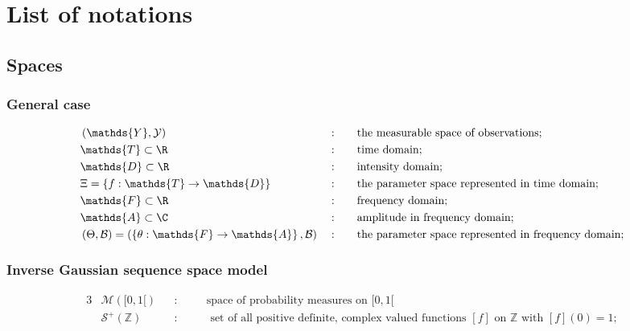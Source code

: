 \chapter*{List of notations}

\section*{Spaces}
\subsection*{General case}
\begin{alignat*}{3}
& \left(\mathds{Y}, \mathcal{Y}\right) &&: && \quad \text{the measurable space of observations};\\
& \mathds{T} \subset \R &&: && \quad \text{time domain};\\
& \mathds{D} \subset \R &&: && \quad \text{intensity domain};\\
& \Xi = \left\{f : \mathds{T} \rightarrow \mathds{D}\right\} &&: && \quad \text{the parameter space represented in time domain};\\
& \mathds{F} \subset \R &&: && \quad \text{frequency domain};\\
& \mathds{A} \subset \C &&: && \quad \text{amplitude in frequency domain};\\
& \left(\Theta, \mathcal{B}\right) = \left(\left\{\theta : \mathds{F} \rightarrow \mathds{A}\right\}, \mathcal{B}\right) &&: && \quad \text{the parameter space represented in frequency domain};
\end{alignat*}

\subsection*{Inverse Gaussian sequence space model}
\begin{alignat*}{3}
& \mathcal{M}([0, 1[) && : && \quad \text{space of probability measures on } [0, 1[\\
& \mathcal{S}^{+}(\mathds{Z}) && : && \quad \text{ set of all positive definite, complex valued functions } [f] \text{ on } \mathds{Z} \text{ with } [f](0) = 1;\\
\end{alignat*}

